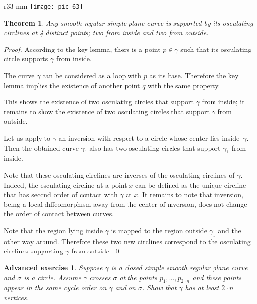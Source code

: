 \documentclass{article}
\theoremstyle{theorem}
\newtheorem{theorem}{Theorem}
\newtheorem*{advancedexercise}{Advanced exercise}
\theoremstyle{definition}
\begin{document}
{

\begin{wrapfigure}{r}{33 mm}
\vskip-4mm
\centering
\texttt{[image: pic-63]}
\vskip0mm
\end{wrapfigure}

\begin{theorem}\label{thm:4-vert}
Any smooth regular simple plane curve is supported by its osculating circlines at 4 distinct points; two from inside and two from outside.
\end{theorem}

\medskip\noindent\textit{Proof.}
According to the key lemma, there is a point $p\in\gamma$ such that its osculating circle supports $\gamma$ from inside.

The curve $\gamma$ can be considered as a loop with $p$ as its base.
Therefore the key lemma implies the existence of another point $q$ with the same property.


This shows the existence of two osculating circles that support $\gamma$ from inside;
it remains to show the existence of two osculating circles that support $\gamma$ from outside.

Let us apply to $\gamma$ an inversion with respect to a circle whose center lies inside~$\gamma$.
Then the obtained curve $\gamma_1$ also has  two osculating circles that support $\gamma_1$ from inside.

}

Note that these osculating circlines are inverses of the osculating circlines of $\gamma$.
Indeed, the osculating circline at a point $x$ can be defined as the unique circline that has second order of contact with $\gamma$ at $x$.
It remains to note that inversion, being a local diffeomorphism away from the center of inversion, does not change the order of contact between curves.

Note that the region lying inside $\gamma$ is mapped to the region outside $\gamma_1$ and the other way around.
Therefore these two new circlines correspond to the osculating circlines supporting $\gamma$ from outside.
\qed

\begin{advancedexercise}\label{ex:curve-crosses-circle}
Suppose $\gamma$ is a closed simple smooth regular plane curve and $\sigma$ is a circle.
Assume $\gamma$ crosses $\sigma$ at the points $p_1,\dots,p_{2{\cdot}n}$ and these points appear in the same cycle order on $\gamma$ and on $\sigma$.
Show that $\gamma$ has at least $2{\cdot}n$ vertices.
\end{advancedexercise}
\end{document}
